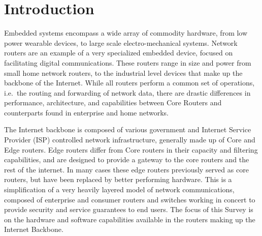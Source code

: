 \section{Introduction}
Embedded systems encompass a wide array of commodity hardware, from low power
wearable devices, to large scale electro-mechanical systems. Network routers
are an example of a very specialized embedded device, focused on facilitating
digital communications. These routers range in size and power from small home
network routers, to the industrial level devices that make up the backbone of
the Internet. While all routers perform a common set of operations, i.e.\ the
routing and forwarding of network data, there are drastic differences in
performance, architecture, and capabilities between Core Routers and
counterparts found in enterprise and home networks.

The Internet backbone is composed of various government and Internet Service
Provider (ISP) controlled network infrastructure, generally made up of Core and
Edge routers. Edge routers differ from Core routers in their capacity and
filtering capabilities, and are designed to provide a gateway to the core
routers and the rest of the internet. In many cases these edge routers
previously served as core routers, but have been replaced by better performing
hardware. This is a simplification of a very heavily layered model of network
communications, composed of enterprise and consumer routers and switches
working in concert to provide security and service guarantees to end users. The
focus of this Survey is on the hardware and software capabilities available in
the routers making up the Internet Backbone.





